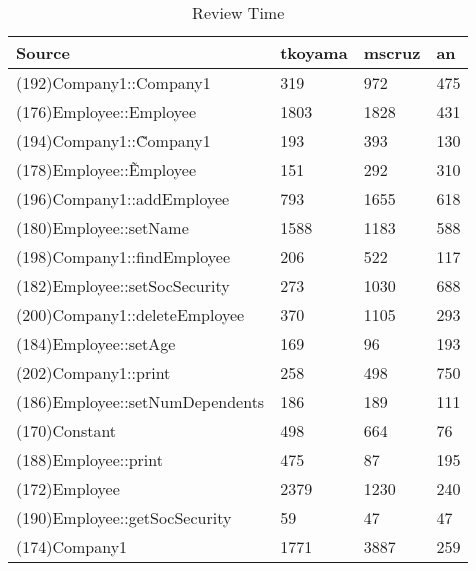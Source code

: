 \begin{table}[hb]
\begin{center}
\begin{tabular}{|l|l|l|l|}
\hline
Source & tkoyama & mscruz & an\\
\hline
(192)Company1::Company1 & 319 & 972 & 475\\
(176)Employee::Employee & 1803 & 1828 & 431\\
(194)Company1::\~Company1 & 193 & 393 & 130\\
(178)Employee::\~Employee & 151 & 292 & 310\\
(196)Company1::addEmployee & 793 & 1655 & 618\\
(180)Employee::setName & 1588 & 1183 & 588\\
(198)Company1::findEmployee & 206 & 522 & 117\\
(182)Employee::setSocSecurity & 273 & 1030 & 688\\
(200)Company1::deleteEmployee & 370 & 1105 & 293\\
(184)Employee::setAge & 169 & 96 & 193\\
(202)Company1::print & 258 & 498 & 750\\
(186)Employee::setNumDependents & 186 & 189 & 111\\
(170)Constant & 498 & 664 & 76\\
(188)Employee::print & 475 & 87 & 195\\
(172)Employee & 2379 & 1230 & 240\\
(190)Employee::getSocSecurity & 59 & 47 & 47\\
(174)Company1 & 1771 & 3887 & 259\\
\hline
\end{tabular}
\end{center}
\caption{Review Time}
\end{table}


